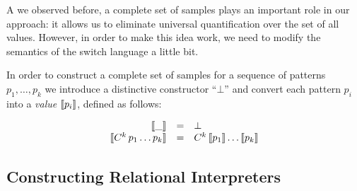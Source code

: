 A we observed before, a complete set of samples plays an important role in our approach: it allows us to eliminate universal quantification over the
set of all values. However, in order to make this idea work, we need to modify the semantics of the switch language a little bit. 

In order to construct a complete set of samples for a sequence of patterns $p_1,\dots,p_k$ we introduce a distinctive constructor ``$\bot$'' and
convert each pattern $p_i$ into a \emph{value} $\llbracket{p_i}\rrbracket$, defined as follows:

\[
\begin{array}{rcl}
  \llbracket{\_}\rrbracket               & = & \bot \\
  \llbracket{C^k\,p_1\dots p_k}\rrbracket & = & C^k\,\llbracket{p_1}\rrbracket\dots\llbracket{p_k}\rrbracket
\end{array}
\]


\subsection{Constructing Relational Interpreters}
\label{sec:relints}
